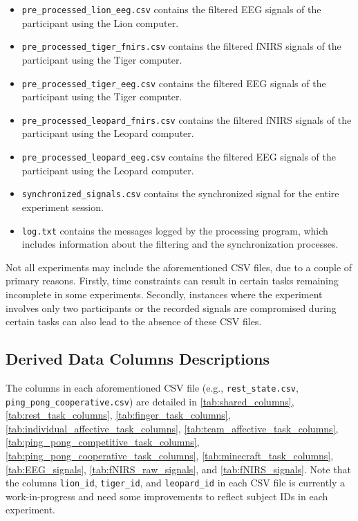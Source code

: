 \begin{itemize}
  \item \texttt{pre\_processed\_lion\_eeg.csv}  contains the filtered EEG signals of the participant using the Lion computer.
  \item \texttt{pre\_processed\_tiger\_fnirs.csv}  contains the filtered fNIRS signals of the participant using the Tiger computer.
  \item \texttt{pre\_processed\_tiger\_eeg.csv}  contains the filtered EEG signals of the participant using the Tiger computer.
  \item \texttt{pre\_processed\_leopard\_fnirs.csv}  contains the filtered fNIRS signals of the participant using the Leopard computer.
  \item \texttt{pre\_processed\_leopard\_eeg.csv}  contains the filtered EEG signals of the participant using the Leopard computer.
  \item \texttt{synchronized\_signals.csv} contains the synchronized signal for the entire experiment session.
  \item \texttt{log.txt} contains the messages logged by the processing program, which includes information about the filtering and the synchronization processes.
\end{itemize}

Not all experiments may include the aforementioned CSV files, due to a couple
of primary reasons. Firstly, time constraints can result in certain tasks
remaining incomplete in some experiments. Secondly, instances where the
experiment involves only two participants or the recorded signals are
compromised during certain tasks can also lead to the absence of these CSV
files.

\subsection{Derived Data Columns Descriptions}
\label{sec:derived_data_cols_desc}

The columns in each aforementioned CSV file (e.g., \texttt{rest\_state.csv},
\texttt{ping\_pong\_cooperative.csv}) are detailed in
\autoref{tab:shared_columns}, \autoref{tab:rest_task_columns},
\autoref{tab:finger_task_columns},
\autoref{tab:individual_affective_task_columns},
\autoref{tab:team_affective_task_columns},
\autoref{tab:ping_pong_competitive_task_columns},
\autoref{tab:ping_pong_cooperative_task_columns},
\autoref{tab:minecraft_task_columns}, \autoref{tab:EEG_signals},
\autoref{tab:fNIRS_raw_signals}, and \autoref{tab:fNIRS_signals}. Note that the columns \texttt{lion\_id}, \texttt{tiger\_id}, and \texttt{leopard\_id} in each CSV file is currently a work-in-progress and need some improvements to reflect subject IDs in each experiment.

